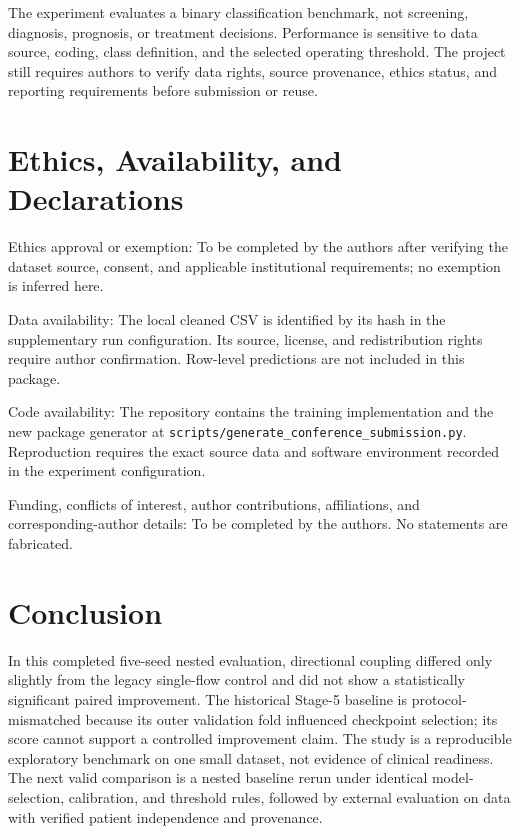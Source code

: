 \documentclass[10pt,twocolumn]{article}
\begin{document}
The experiment evaluates a binary classification benchmark, not screening, diagnosis, prognosis, or treatment decisions. Performance is sensitive to data source, coding, class definition, and the selected operating threshold. The project still requires authors to verify data rights, source provenance, ethics status, and reporting requirements before submission or reuse.

\section{Ethics, Availability, and Declarations}

Ethics approval or exemption: To be completed by the authors after verifying the dataset source, consent, and applicable institutional requirements; no exemption is inferred here.

Data availability: The local cleaned CSV is identified by its hash in the supplementary run configuration. Its source, license, and redistribution rights require author confirmation. Row-level predictions are not included in this package.

Code availability: The repository contains the training implementation and the new package generator at \texttt{scripts/generate\_conference\_submission.py}. Reproduction requires the exact source data and software environment recorded in the experiment configuration.

Funding, conflicts of interest, author contributions, affiliations, and corresponding-author details: To be completed by the authors. No statements are fabricated.

\section{Conclusion}

In this completed five-seed nested evaluation, directional coupling differed only slightly from the legacy single-flow control and did not show a statistically significant paired improvement. The historical Stage-5 baseline is protocol-mismatched because its outer validation fold influenced checkpoint selection; its score cannot support a controlled improvement claim. The study is a reproducible exploratory benchmark on one small dataset, not evidence of clinical readiness. The next valid comparison is a nested baseline rerun under identical model-selection, calibration, and threshold rules, followed by external evaluation on data with verified patient independence and provenance.
\end{document}
